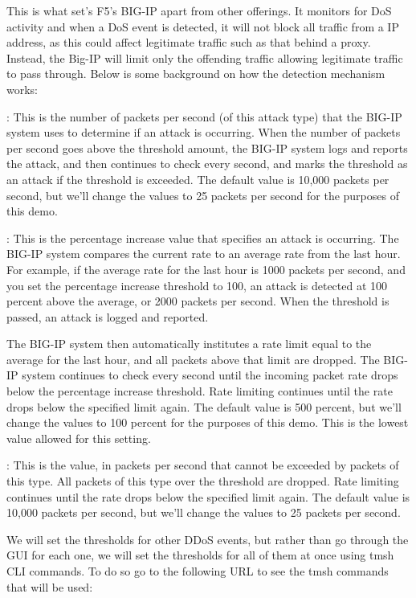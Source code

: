 \documentclass[letterpaper,10pt,english]{sphinxmanual}
\begin{document}
This is what set’s F5’s BIG-IP apart from other offerings. It monitors
for DoS activity and when a DoS event is detected, it will not block all
traffic from a IP address, as this could affect legitimate traffic such
as that behind a proxy. Instead, the Big-IP will limit only the
offending traffic allowing legitimate traffic to pass through. Below is
some background on how the detection mechanism works:

: This is the number of packets per
second (of this attack type) that the BIG-IP system uses to
determine if an attack is occurring. When the number of packets per
second goes above the threshold amount, the BIG-IP system logs and
reports the attack, and then continues to check every second, and
marks the threshold as an attack if the threshold is exceeded. The
default value is 10,000 packets per second, but we’ll change the
values to 25 packets per second for the purposes of this demo.

: This is the percentage increase
value that specifies an attack is occurring. The BIG-IP system
compares the current rate to an average rate from the last hour. For
example, if the average rate for the last hour is 1000 packets per
second, and you set the percentage increase threshold to 100, an
attack is detected at 100 percent above the average, or 2000 packets
per second. When the threshold is passed, an attack is logged and
reported.

The BIG-IP system then automatically institutes a rate limit equal
to the average for the last hour, and all packets above that limit
are dropped. The BIG-IP system continues to check every second until
the incoming packet rate drops below the percentage increase
threshold. Rate limiting continues until the rate drops below the
specified limit again. The default value is 500 percent, but we’ll
change the values to 100 percent for the purposes of this demo. This
is the lowest value allowed for this setting.

: This is the value, in packets per second that
cannot be exceeded by packets of this type. All packets of this type
over the threshold are dropped. Rate limiting continues until the
rate drops below the specified limit again. The default value is
10,000 packets per second, but we’ll change the values to 25 packets
per second.

We will set the thresholds for other DDoS events, but rather than go
through the GUI for each one, we will set the thresholds for all of them
at once using tmsh CLI commands. To do so go to the following URL to see
the tmsh commands that will be used:
\end{document}
